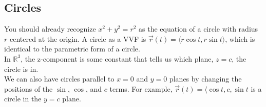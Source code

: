 \subsection{Circles}
\noindent
You should already recognize $x^2+y^2=r^2$ as the equation of a circle with radius $r$ centered at the origin. A circle as a VVF is $\vec{r}(t)=\langle r\cos{t}, r\sin{t} \rangle$, which is identical to the parametric form of a circle.\\
In $\mathbb{R}^3$, the z-component is some constant that tells us which plane, $z=c$, the circle is in.\\ 
We can also have circles parallel to $x=0$ and $y=0$ planes by changing the positions of the $\sin$, $\cos$, and $c$ terms. For example, $\vec{r}(t)=\langle \cos{t}, c, \sin{t}$ is a circle in the $y=c$ plane.